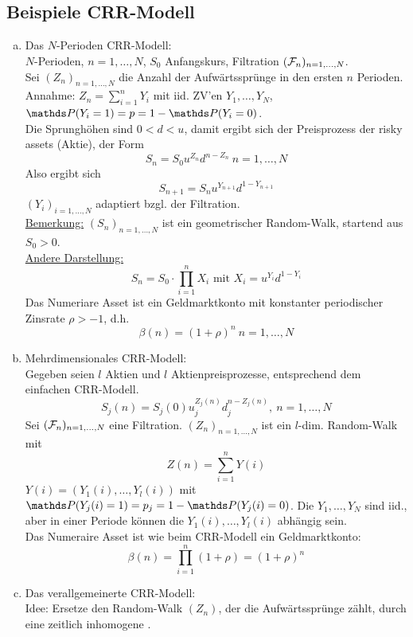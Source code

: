 \subsection{Beispiele CRR-Modell}
\label{sub:bsp_crr}
\begin{enumerate}[(a)]
	\item Das $N$-Perioden CRR-Modell:\\
	$N$-Perioden, $n=1,\dots,N$, $S_0$ Anfangskurs, Filtration $(\mathcal{F}_n)_{n=1,\dots,N}$.\\
	Sei $(Z_n)_{n=1,\dots,N}$ die Anzahl der Aufwärtssprünge in den ersten $n$ Perioden.\\
	Annahme: $Z_n=\sum_{i=1}^{n}Y_i$ mit iid. ZV'en $Y_1,\dots,Y_N$, $\Pw(Y_i=1)=p=1-\Pw(Y_i=0)$.\\
	Die Sprunghöhen sind $0<d<u$, damit ergibt sich der Preisprozess der risky assets (Aktie), der Form 
	\[
	S_n=S_0u^{Z_n}d^{n-Z_n}~ n=1,\dots,N	
	\]
	Also ergibt sich
	\[
	S_{n+1}=S_nu^{Y_{n+1}}d^{1-Y_{n+1}}
	\]
	$(Y_i)_{i=1,\dots,N}$ adaptiert bzgl. der Filtration.\\
	\uline{Bemerkung:} $(S_n)_{n=1,\dots,N}$ ist ein geometrischer Random-Walk, startend aus $S_0>0$.\\
	\uline{Andere Darstellung:}
	\[
	S_n=S_0\cdot \prod_{i=1}^{n}X_i \text{ mit } X_i=u^{Y_i}d^{1-Y_i}
	\]
	Das Numeriare Asset ist ein Geldmarktkonto mit konstanter periodischer Zinsrate $\rho>-1$, d.h.
	\[
	\beta(n)=(1+\rho)^n ~ n=1,\dots,N
	\]
	\item Mehrdimensionales CRR-Modell:\\
	Gegeben seien $l$ Aktien und $l$ Aktienpreisprozesse, entsprechend dem einfachen CRR-Modell.
	\[
	S_j(n) = S_j(0)u_j^{Z_j(n)}d_j^{n-Z_j(n)},~ n=1,\dots, N
	\]
	Sei $(\mathcal{F}_n)_{n=1,\dots,N}$ eine Filtration. $(Z_n)_{n=1,\dots,N}$ ist ein $l$-dim. Random-Walk mit 
	\[
	Z(n)=\sum_{i=1}^{n}Y(i)
	\]
	$Y(i)=(Y_1(i),\dots,Y_l(i))$ mit $\Pw(Y_j(i)=1)=p_j=1-\Pw(Y_j(i)=0)$. 
	Die $Y_1,\dots,Y_N$ sind iid., aber in einer Periode können die $Y_1(i),\dots,Y_l(i)$ abhängig sein.\\
	Das Numeraire Asset ist wie beim CRR-Modell ein Geldmarktkonto:
	\[
	\beta(n)=\prod_{i=1}^{n}(1+\rho)=(1+\rho)^n
	\]
	\item Das verallgemeinerte CRR-Modell:\\
	Idee: Ersetze den Random-Walk $(Z_n)$, der die Aufwärtssprünge zählt, durch eine zeitlich inhomogene .\\

\end{enumerate}
